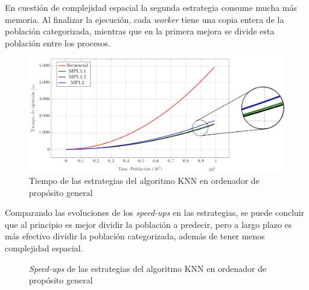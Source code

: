 En cuestión de complejidad espacial la segunda estrategia consume mucha más memoria. Al finalizar la ejecución, cada \textit{worker} tiene una copia entera de la población categorizada, mientras que en la primera mejora se divide esta población entre los procesos. 


\begin{figure}[!h]
	\centering
	\includegraphics[width=1\textwidth]{images/chapter_4/knn_mpi}
	\caption{Tiempo de las estrategias del algoritmo KNN en ordenador de propósito general}
	\label{fig:knn_ordenador}
\end{figure}


Comparando las evoluciones de los \textit{speed-ups} en las estrategias, se puede concluir que al principio es mejor dividir la población a predecir, pero a largo plazo es más efectivo dividir la población categorizada, además de tener menos complejidad espacial. 

\begin{figure} [!h]
	\centering
	\caption{\textit{Speed-ups} de las estrategias del algoritmo KNN en ordenador de propósito general}
\end{figure}


